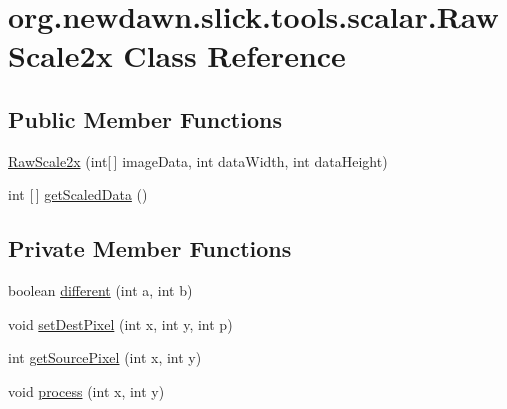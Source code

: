 \hypertarget{classorg_1_1newdawn_1_1slick_1_1tools_1_1scalar_1_1_raw_scale2x}{}\section{org.\+newdawn.\+slick.\+tools.\+scalar.\+Raw\+Scale2x Class Reference}
\label{classorg_1_1newdawn_1_1slick_1_1tools_1_1scalar_1_1_raw_scale2x}
\subsection*{Public Member Functions}
\begin{DoxyCompactItemize}
\item 
\mbox{\hyperlink{classorg_1_1newdawn_1_1slick_1_1tools_1_1scalar_1_1_raw_scale2x_a10575ba9d5027a48f73e3c13db0b9356}{Raw\+Scale2x}} (int\mbox{[}$\,$\mbox{]} image\+Data, int data\+Width, int data\+Height)
\item 
int \mbox{[}$\,$\mbox{]} \mbox{\hyperlink{classorg_1_1newdawn_1_1slick_1_1tools_1_1scalar_1_1_raw_scale2x_a89ae2bf07fe3affbec9e738bfbf107a3}{get\+Scaled\+Data}} ()
\end{DoxyCompactItemize}
\subsection*{Private Member Functions}
\begin{DoxyCompactItemize}
\item 
boolean \mbox{\hyperlink{classorg_1_1newdawn_1_1slick_1_1tools_1_1scalar_1_1_raw_scale2x_aca90dee7407dd4388ddcd6e146a093ab}{different}} (int a, int b)
\item 
void \mbox{\hyperlink{classorg_1_1newdawn_1_1slick_1_1tools_1_1scalar_1_1_raw_scale2x_a0f130572d39c08480c6eba1fa8a63838}{set\+Dest\+Pixel}} (int x, int y, int p)
\item 
int \mbox{\hyperlink{classorg_1_1newdawn_1_1slick_1_1tools_1_1scalar_1_1_raw_scale2x_af37d8a900144bb574afb317fac5d23ee}{get\+Source\+Pixel}} (int x, int y)
\item 
void \mbox{\hyperlink{classorg_1_1newdawn_1_1slick_1_1tools_1_1scalar_1_1_raw_scale2x_a9b487c958a8d6498f319877102f6a390}{process}} (int x, int y)
\end{DoxyCompactItemize}
